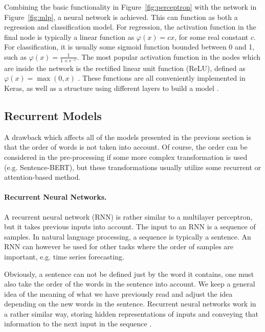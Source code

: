 Combining the basic functionality in Figure~\ref{fig:perceptron} with the network in Figure~\ref{fig:mlp}, a neural network is achieved. This can function as both a regression and classification model. For regression, the activation function in the final node is typically a linear function as $\varphi(x) = cx$, for some real constant $c$. For classification, it is usually some sigmoid function bounded between 0 and 1, such as $\displaystyle{\varphi(x) = \frac{1}{1 + e^{-x}}}$. The most popular activation function in the nodes which are inside the network is the rectified linear unit function (ReLU), defined as $\varphi(x) = \max(0,x)$ \citep{Goodfellow-et-al-2016}. These functions are all conveniently implemented in Keras, as well as a structure using different layers to build a model \citep{chollet2020keras}. 

\subsection{Recurrent Models}\label{sec:recmods}

A drawback which affects all of the models presented in the previous section is that the order of words is not taken into account. Of course, the order can be considered in the pre-processing if some more complex transformation is used (e.g. Sentence-BERT), but these transformations usually utilize some recurrent or attention-based method. 

\paragraph{Recurrent Neural Networks.}

A recurrent neural network (RNN) is rather similar to a multilayer perceptron, but it takes previous inputs into account. The input to an RNN is a sequence of samples. In natural language processing, a sequence is typically a sentence. An RNN can however be used for other tasks where the order of samples are important, e.g. time series forecasting.

Obviously, a sentence can not be defined just by the word it contains, one must also take the order of the words in the sentence into account. We keep a general idea of the meaning of what we have previously read and adjust the idea depending on the new words in the sentence. Recurrent neural networks work in a rather similar way, storing hidden representations of inputs and conveying that information to the next input in the sequence \citep{Goodfellow-et-al-2016}. 

